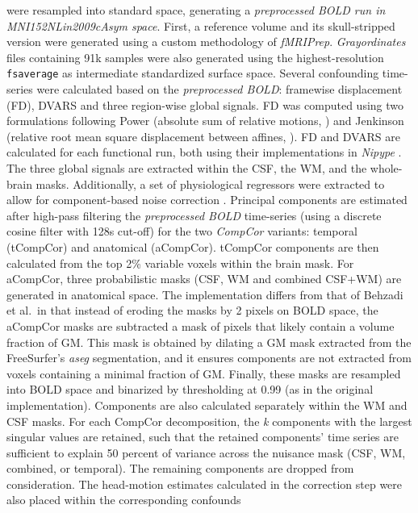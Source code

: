 \documentclass[]{article}
\begin{document}
\begin{description}
were resampled into standard space, generating a \emph{preprocessed BOLD
run in MNI152NLin2009cAsym space}. First, a reference volume and its
skull-stripped version were generated using a custom methodology of
\emph{fMRIPrep}. \emph{Grayordinates} files \citep{hcppipelines}
containing 91k samples were also generated using the highest-resolution
\texttt{fsaverage} as intermediate standardized surface space. Several
confounding time-series were calculated based on the \emph{preprocessed
BOLD}: framewise displacement (FD), DVARS and three region-wise global
signals. FD was computed using two formulations following Power
(absolute sum of relative motions, \citet{power_fd_dvars}) and Jenkinson
(relative root mean square displacement between affines,
\citet{mcflirt}). FD and DVARS are calculated for each functional run,
both using their implementations in \emph{Nipype} \citep[following the
definitions by][]{power_fd_dvars}. The three global signals are
extracted within the CSF, the WM, and the whole-brain masks.
Additionally, a set of physiological regressors were extracted to allow
for component-based noise correction \citep[\emph{CompCor},][]{compcor}.
Principal components are estimated after high-pass filtering the
\emph{preprocessed BOLD} time-series (using a discrete cosine filter
with 128s cut-off) for the two \emph{CompCor} variants: temporal
(tCompCor) and anatomical (aCompCor). tCompCor components are then
calculated from the top 2\% variable voxels within the brain mask. For
aCompCor, three probabilistic masks (CSF, WM and combined CSF+WM) are
generated in anatomical space. The implementation differs from that of
Behzadi et al.~in that instead of eroding the masks by 2 pixels on BOLD
space, the aCompCor masks are subtracted a mask of pixels that likely
contain a volume fraction of GM. This mask is obtained by dilating a GM
mask extracted from the FreeSurfer's \emph{aseg} segmentation, and it
ensures components are not extracted from voxels containing a minimal
fraction of GM. Finally, these masks are resampled into BOLD space and
binarized by thresholding at 0.99 (as in the original implementation).
Components are also calculated separately within the WM and CSF masks.
For each CompCor decomposition, the \emph{k} components with the largest
singular values are retained, such that the retained components' time
series are sufficient to explain 50 percent of variance across the
nuisance mask (CSF, WM, combined, or temporal). The remaining components
are dropped from consideration. The head-motion estimates calculated in
the correction step were also placed within the corresponding confounds

\end{description}
\end{document}
